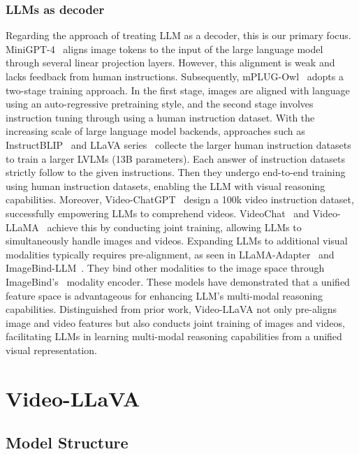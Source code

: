 \subsubsection{LLMs as decoder} Regarding the approach of treating LLM as a decoder, this is our primary focus. MiniGPT-4~\cite{zhu2023minigpt} aligns image tokens to the input of the large language model through several linear projection layers. However, this alignment is weak and lacks feedback from human instructions. Subsequently, mPLUG-Owl~\cite{ye2023mplug} adopts a two-stage training approach. In the first stage, images are aligned with language using an auto-regressive pretraining style, and the second stage involves instruction tuning through using a human instruction dataset. With the increasing scale of large language model backends, approaches such as InstructBLIP~\cite{dai2023instructblip} and LLaVA series~\cite{liu2023visual,liu2023improved, lin2024moe} collecte the larger human instruction datasets to train a larger LVLMs (13B parameters). Each answer of instruction datasets strictly follow to the given instructions. Then they undergo end-to-end training using human instruction datasets, enabling the LLM with visual reasoning capabilities. Moreover, Video-ChatGPT~\cite{maaz2023video} design a 100k video instruction dataset, successfully empowering LLMs to comprehend videos. VideoChat~\cite{li2023videochat} and Video-LLaMA~\cite{zhang2023video} achieve this by conducting joint training, allowing LLMs to simultaneously handle images and videos. Expanding LLMs to additional visual modalities typically requires pre-alignment, as seen in LLaMA-Adapter~\cite{zhang2023llama,gao2023llama} and ImageBind-LLM~\cite{han2023imagebind}. They bind other modalities to the image space through ImageBind's~\cite{girdhar2023imagebind} modality encoder. These models have demonstrated that a unified feature space is advantageous for enhancing LLM's multi-modal reasoning capabilities. Distinguished from prior work, Video-LLaVA not only pre-aligns image and video features but also conducts joint training of images and videos, facilitating LLMs in learning multi-modal reasoning capabilities from a unified visual representation.

\section{Video-LLaVA}
\label{sec:videollava}

\subsection{Model Structure}

